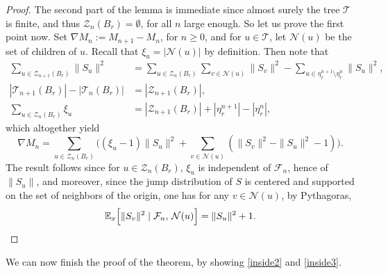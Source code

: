 \begin{proof}
The second part of the lemma is immediate
since almost surely the tree $\mathcal T$ is finite, and thus $\mathcal Z_n(B_r)= \emptyset$,
for all $n$ large enough.
So let us prove the first point now. Set $\nabla M_n := M_{n+1}- M_n$,
for $n\ge 0$, and for $u\in \mathbf{\mathcal T}$,
let $\mathcal N(u)$ be the set of children of $u$.
Recall that $\xi_u = |\mathcal N(u)|$ by definition.
Then note that
\begin{align*}
\sum_{u\in \mathcal Z_{n+1}(B_r)} \|S_u\|^2 &= \sum_{u\in \mathcal Z_n(B_r)} \sum_{v\in \mathcal N(u)} \|S_v\|^2 -
\sum_{u\in \eta_r^{n+1}\setminus \eta_r^n} \|S_u\|^2, \\
|\mathcal T_{n+1}(B_r)| -|\mathcal T_n(B_r)| &= |\mathcal Z_{n+1}(B_r)|, \\
\sum_{u\in \mathcal Z_n(B_r)} \xi_u &= |\mathcal Z_{n+1}(B_r)| + |\eta_r^{n+1}| - |\eta_r^n|,
\end{align*}
which altogether yield
\begin{equation}\label{nablaM}
\nabla M_n = \sum_{u\in \mathcal Z_n(B_r)} \Big((\xi_u - 1) \|S_u\|^2 + \sum_{v\in \mathcal N(u)} (\|S_v\|^2 - \|S_u\|^2-1)\Big).
\end{equation}
The result follows since for $u \in \mathcal Z_n(B_r)$,
$\xi_u$ is independent of $\mathcal F_n$, hence of $\|S_u\|$, and moreover, since the jump
distribution of $S$ is centered and supported on the set of
neighbors of the origin, one has for any $v\in \mathcal N(u)$, by Pythagoras,
\[
\mathbb E_x\Big[ \|S_v\|^2 \mid \mathcal F_n, \, \mathcal N(u)\Big] = \|S_u\|^2 + 1.\qedhere
\]
\end{proof}

We can now finish the proof of the theorem,
by showing \eqref{inside2} and \eqref{inside3}.

